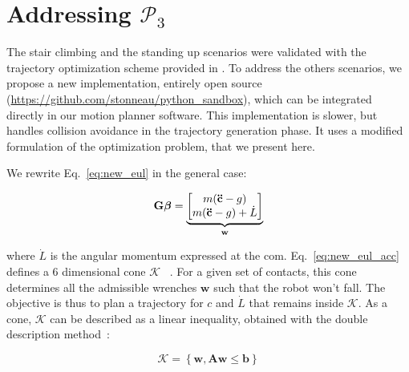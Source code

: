 \section{Addressing $\mathcal{P}_3$}
\label{app:optim}
The stair climbing and the standing up scenarios were validated with the trajectory optimization scheme provided in \citeauthor{Carpentier2016}. 
To address the others scenarios, we propose a new implementation, entirely open source (\url{https://github.com/stonneau/python_sandbox}), which can be integrated directly in our motion planner software.
This implementation is slower, but handles collision avoidance in the trajectory generation phase.
It uses a modified formulation of the optimization problem, that we present here.

We rewrite Eq.~\ref{eq:new_eul} in the general case:


\begin{align} \label{eq:new_eul_acc}
\mathbf{G} \bm{\beta} = 
\underbrace{\begin{bmatrix}m (\mathbf{\ddot{c}} - {g}) \\m (\mathbf{\ddot{c}} - {g}) + \dot{L}\end{bmatrix}}_{\mathbf{w}}
\end{align}

where $\dot{L}$ is the angular momentum expressed at the com.
Eq.~\ref{eq:new_eul_acc} defines a 6 dimensional cone $\mathcal{K}$ ~\citep{qiu:dhm:2011,Caron2015}. For a given set of contacts,
this cone determines all the admissible wrenches $\mathbf{w}$ such that the robot won't fall. The objective 
is thus to plan a trajectory for $c$ and $\dot{L}$ that remains inside $\mathcal{K}$. As a cone,
$\mathcal{K}$ can be described as a linear inequality, obtained with the double description method~\citep{Fukuda1996}:

\begin{equation}
\label{eq:cone_k}
	\mathcal{K} =  \left\{ \mathbf{w}, \mathbf{A}\mathbf{w} \leq \mathbf{b	} \right\}
\end{equation}

